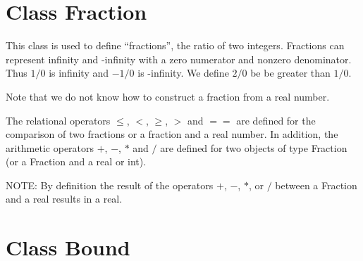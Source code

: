 \section{Class Fraction}

This class is used to define ``fractions'', the ratio of two integers.
Fractions can represent infinity and -infinity with a
zero numerator and nonzero denominator. Thus $1/0$ is infinity
and $-1/0$ is -infinity. We define $2/0$ be be greater than $1/0$.

% 
% 
% 
\noindent
Note that we do not know how to construct a fraction from a real number.
% 

The relational operators $\le$, $<$, $\ge$, $>$ and $==$ are defined for
the comparison of two fractions or a fraction and a real number.
In addition, the arithmetic operators $+$, $-$, $*$ and $/$ are defined for
two objects of type Fraction (or a Fraction and a real or int). 

\noindent
NOTE: By definition
the result of the operators $+$, $-$, $*$, or $/$ between a Fraction and
a real results in a real. 




\section{Class Bound}

